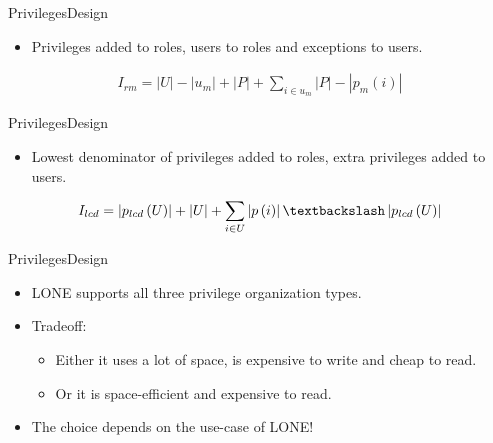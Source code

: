 \begin{frame}{Privileges}{Design}
  \begin{block}{}
  	\begin{itemize}
  		\item Privileges added to roles, users to roles and exceptions to users.
  	\end{itemize}

	\begin{align}
		I_{rm} = |U| - |u_{m}| + |P| + \sum_{i \in u_{m}} |P|-|p_{m}(i)|
	\end{align}
  \end{block}
\end{frame}

\begin{frame}{Privileges}{Design}
  \begin{block}{}
  	\begin{itemize}
  		\item Lowest denominator of privileges added to roles, extra privileges added to users.
  	\end{itemize}
  	
	\begin{align}
		I_{lcd} = \left|p_{lcd}\left(U\right)\right| + \left|U\right| + \sum_{i \in U} \left|p\left(i\right)\right|\textbackslash\left|p_{lcd}\left(U\right)\right|
	\end{align}
  \end{block}
\end{frame}

\begin{frame}{Privileges}{Design}
  \begin{block}{}
  	\begin{itemize}
  		\item LONE supports all three privilege organization types.
  		\item Tradeoff:
  		\begin{itemize}
  			\item Either it uses a lot of space, is expensive to write and cheap to read.
  			\item Or it is space-efficient and expensive to read. 
  		\end{itemize}
  		\item The choice depends on the use-case of LONE!
  	\end{itemize}
  \end{block}
\end{frame}




